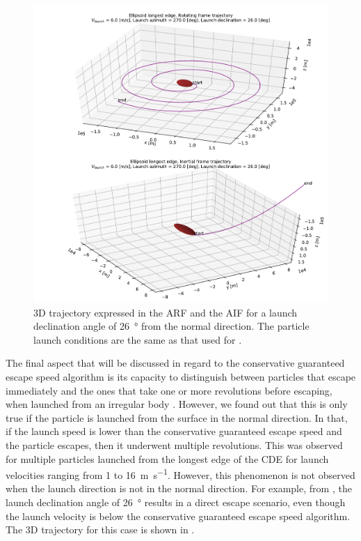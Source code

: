 \begin{figure}[htb]
\centering
\captionsetup{justification=centering}
\includegraphics[width=\textwidth, height=0.55\textheight, keepaspectratio=true]{non_conservative_escape_speed/directEscape_3D_trajectory_declination26.pdf}
\caption{3D trajectory expressed in the \gls{ARF} and the \gls{AIF} for a launch declination angle of \SI{26}{\degree} from the normal direction. The particle launch conditions are the same as that used for \protect{}.}
\label{fig:3d_traj_declination_26}
\end{figure}
\FloatBarrier
The final aspect that will be discussed in regard to the conservative guaranteed escape speed algorithm is its capacity to distinguish between particles that escape immediately and the ones that take one or more revolutions before escaping, when launched from an irregular body \parencite{scheeres2002fate}. However, we found out that this is only true if the particle is launched from the surface in the normal direction. In that, if the launch speed is lower than the conservative guaranteed escape speed and the particle escapes, then it underwent multiple revolutions. This was observed for multiple particles launched from the longest edge of the \gls{CDE} for launch velocities ranging from 1 to \SI{16}{\metre \per \second}. However, this phenomenon is not observed when the launch direction is not in the normal direction. For example, from , the launch declination angle of \SI{26}{\degree} results in a direct escape scenario, even though the launch velocity is below the conservative guaranteed escape speed algorithm. The 3D trajectory for this case is shown in .
